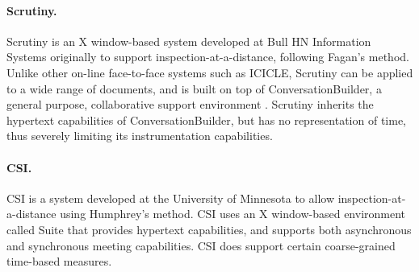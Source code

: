 \paragraph{Scrutiny.}

Scrutiny \cite{Gintell93} is an X window-based system developed at Bull HN
Information Systems originally to support inspection-at-a-distance,
following Fagan's method.  Unlike other on-line face-to-face systems such
as ICICLE, Scrutiny can be applied to a wide range of documents, and is
built on top of ConversationBuilder, a general purpose, collaborative
support environment \cite{Kaplan92}.  Scrutiny inherits the hypertext
capabilities of ConversationBuilder, but has no representation of time,
thus severely limiting its instrumentation capabilities.


\paragraph {CSI.}

CSI \cite{Mashayekhi93} is a system developed at the University of
Minnesota to allow inspection-at-a-distance using Humphrey's method.  CSI
uses an X window-based environment called Suite that provides hypertext
capabilities, and supports both asynchronous and synchronous meeting
capabilities.  CSI does support certain coarse-grained time-based measures.

